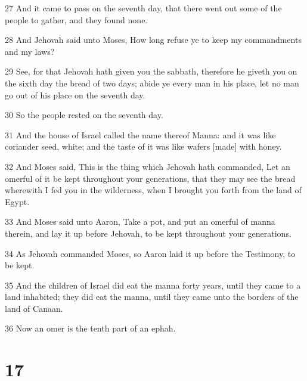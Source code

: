 \par 27 And it came to pass on the seventh day, that there went out some of the people to gather, and they found none.
\par 28 And Jehovah said unto Moses, How long refuse ye to keep my commandments and my laws?
\par 29 See, for that Jehovah hath given you the sabbath, therefore he giveth you on the sixth day the bread of two days; abide ye every man in his place, let no man go out of his place on the seventh day.
\par 30 So the people rested on the seventh day.
\par 31 And the house of Israel called the name thereof Manna: and it was like coriander seed, white; and the taste of it was like wafers [made] with honey.
\par 32 And Moses said, This is the thing which Jehovah hath commanded, Let an omerful of it be kept throughout your generations, that they may see the bread wherewith I fed you in the wilderness, when I brought you forth from the land of Egypt.
\par 33 And Moses said unto Aaron, Take a pot, and put an omerful of manna therein, and lay it up before Jehovah, to be kept throughout your generations.
\par 34 As Jehovah commanded Moses, so Aaron laid it up before the Testimony, to be kept.
\par 35 And the children of Israel did eat the manna forty years, until they came to a land inhabited; they did eat the manna, until they came unto the borders of the land of Canaan.
\par 36 Now an omer is the tenth part of an ephah.

\chapter{17}

